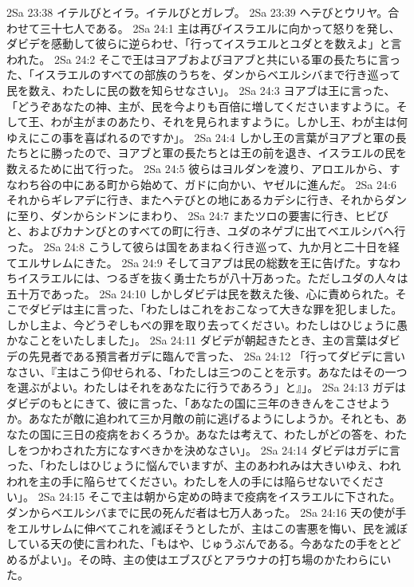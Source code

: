 2Sa 23:38  イテルびとイラ。イテルびとガレブ。
2Sa 23:39  ヘテびとウリヤ。合わせて三十七人である。
2Sa 24:1  主は再びイスラエルに向かって怒りを発し、ダビデを感動して彼らに逆らわせ、「行ってイスラエルとユダとを数えよ」と言われた。
2Sa 24:2  そこで王はヨアブおよびヨアブと共にいる軍の長たちに言った、「イスラエルのすべての部族のうちを、ダンからベエルシバまで行き巡って民を数え、わたしに民の数を知らせなさい」。
2Sa 24:3  ヨアブは王に言った、「どうぞあなたの神、主が、民を今よりも百倍に増してくださいますように。そして王、わが主がまのあたり、それを見られますように。しかし王、わが主は何ゆえにこの事を喜ばれるのですか」。
2Sa 24:4  しかし王の言葉がヨアブと軍の長たちとに勝ったので、ヨアブと軍の長たちとは王の前を退き、イスラエルの民を数えるために出て行った。
2Sa 24:5  彼らはヨルダンを渡り、アロエルから、すなわち谷の中にある町から始めて、ガドに向かい、ヤゼルに進んだ。
2Sa 24:6  それからギレアデに行き、またヘテびとの地にあるカデシに行き、それからダンに至り、ダンからシドンにまわり、
2Sa 24:7  またツロの要害に行き、ヒビびと、およびカナンびとのすべての町に行き、ユダのネゲブに出てベエルシバへ行った。
2Sa 24:8  こうして彼らは国をあまねく行き巡って、九か月と二十日を経てエルサレムにきた。
2Sa 24:9  そしてヨアブは民の総数を王に告げた。すなわちイスラエルには、つるぎを抜く勇士たちが八十万あった。ただしユダの人々は五十万であった。
2Sa 24:10  しかしダビデは民を数えた後、心に責められた。そこでダビデは主に言った、「わたしはこれをおこなって大きな罪を犯しました。しかし主よ、今どうぞしもべの罪を取り去ってください。わたしはひじょうに愚かなことをいたしました」。
2Sa 24:11  ダビデが朝起きたとき、主の言葉はダビデの先見者である預言者ガデに臨んで言った、
2Sa 24:12  「行ってダビデに言いなさい、『主はこう仰せられる、「わたしは三つのことを示す。あなたはその一つを選ぶがよい。わたしはそれをあなたに行うであろう」と』」。
2Sa 24:13  ガデはダビデのもとにきて、彼に言った、「あなたの国に三年のききんをこさせようか。あなたが敵に追われて三か月敵の前に逃げるようにしようか。それとも、あなたの国に三日の疫病をおくろうか。あなたは考えて、わたしがどの答を、わたしをつかわされた方になすべきかを決めなさい」。
2Sa 24:14  ダビデはガデに言った、「わたしはひじょうに悩んでいますが、主のあわれみは大きいゆえ、われわれを主の手に陥らせてください。わたしを人の手には陥らせないでください」。
2Sa 24:15  そこで主は朝から定めの時まで疫病をイスラエルに下された。ダンからベエルシバまでに民の死んだ者は七万人あった。
2Sa 24:16  天の使が手をエルサレムに伸べてこれを滅ぼそうとしたが、主はこの害悪を悔い、民を滅ぼしている天の使に言われた、「もはや、じゅうぶんである。今あなたの手をとどめるがよい」。その時、主の使はエブスびとアラウナの打ち場のかたわらにいた。
